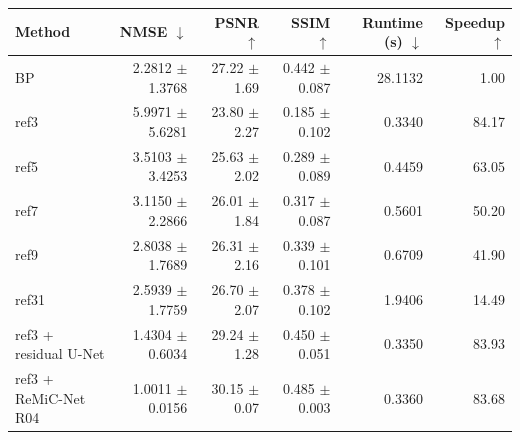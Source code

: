 \begin{tabular}{lrrrrr}
\toprule
Method & NMSE $\downarrow$ & PSNR $\uparrow$ & SSIM $\uparrow$ & Runtime (s) $\downarrow$ & Speedup $\uparrow$ \\
\midrule
BP & 2.2812 $\pm$ 1.3768 & 27.22 $\pm$ 1.69 & 0.442 $\pm$ 0.087 & 28.1132 & 1.00 \\
ref3 & 5.9971 $\pm$ 5.6281 & 23.80 $\pm$ 2.27 & 0.185 $\pm$ 0.102 & 0.3340 & 84.17 \\
ref5 & 3.5103 $\pm$ 3.4253 & 25.63 $\pm$ 2.02 & 0.289 $\pm$ 0.089 & 0.4459 & 63.05 \\
ref7 & 3.1150 $\pm$ 2.2866 & 26.01 $\pm$ 1.84 & 0.317 $\pm$ 0.087 & 0.5601 & 50.20 \\
ref9 & 2.8038 $\pm$ 1.7689 & 26.31 $\pm$ 2.16 & 0.339 $\pm$ 0.101 & 0.6709 & 41.90 \\
ref31 & 2.5939 $\pm$ 1.7759 & 26.70 $\pm$ 2.07 & 0.378 $\pm$ 0.102 & 1.9406 & 14.49 \\
ref3 + residual U-Net & 1.4304 $\pm$ 0.6034 & 29.24 $\pm$ 1.28 & 0.450 $\pm$ 0.051 & 0.3350 & 83.93 \\
ref3 + ReMiC-Net R04 & 1.0011 $\pm$ 0.0156 & 30.15 $\pm$ 0.07 & 0.485 $\pm$ 0.003 & 0.3360 & 83.68 \\
\bottomrule
\end{tabular}
